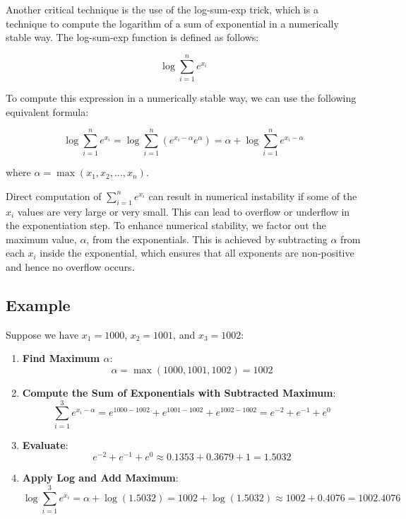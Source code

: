 \documentclass[PhD]{PHlab-thesis}
\begin{document}
Another critical technique is the use of the log-sum-exp trick, which is a technique to compute the logarithm of a sum of exponential in a numerically stable way. The log-sum-exp function is defined as follows:

\[
\log \sum_{i=1}^{n} e^{x_i}
\]

To compute this expression in a numerically stable way, we can use the following equivalent formula:

\[
\log \sum_{i=1}^{n} e^{x_i} =   \log \sum_{i=1}^{n} (e^{x_i-\alpha} e^{\alpha})
                            =    \alpha + \log \sum_{i=1}^{n} e^{x_i - \alpha}
\]

where \(\alpha = \max(x_1, x_2, \ldots, x_n)\).

Direct computation of \(\sum_{i=1}^{n} e^{x_i}\) can result in numerical instability if some of the \(x_i\) values are very large or very small. This can lead to overflow or underflow in the exponentiation step. To enhance numerical stability, we factor out the maximum value, \(\alpha\), from the exponentials. This is achieved by subtracting \(\alpha\) from each \(x_i\) inside the exponential, which ensures that all exponents are non-positive and hence no overflow occurs.

\subsection{Example}

Suppose we have \(x_1 = 1000\), \(x_2 = 1001\), and \(x_3 = 1002\):

\begin{enumerate}
    \item \textbf{Find Maximum \(\alpha\)}:
    \[
    \alpha = \max(1000, 1001, 1002) = 1002
    \]
    
    \item \textbf{Compute the Sum of Exponentials with Subtracted Maximum}:
    \[
    \sum_{i=1}^{3} e^{x_i - \alpha} = e^{1000 - 1002} + e^{1001 - 1002} + e^{1002 - 1002} = e^{-2} + e^{-1} + e^{0}
    \]
    
    \item \textbf{Evaluate}:
    \[
    e^{-2} + e^{-1} + e^{0} \approx 0.1353 + 0.3679 + 1 = 1.5032
    \]
    
    \item \textbf{Apply Log and Add Maximum}:
    \[
    \log \sum_{i=1}^{3} e^{x_i} = \alpha + \log (1.5032) = 1002 + \log (1.5032) \approx 1002 + 0.4076 = 1002.4076
    \]
\end{enumerate}
\end{document}
